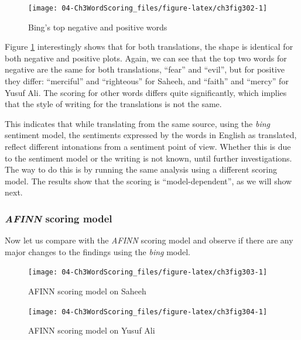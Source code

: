 \documentclass[
]{article}
\begin{document}
\begin{figure}

{\centering \texttt{[image: 04-Ch3WordScoring\_files/figure-latex/ch3fig302-1]} 

}

\caption{Bing's top negative and positive words}\label{fig:ch3fig302}
\end{figure}

Figure \ref{fig:ch3fig302} interestingly shows that for both translations, the shape is identical for both negative and positive plots. Again, we can see that the top two words for negative are the same for both translations, ``fear'' and ``evil'', but for positive they differ: ``merciful'' and ``righteous'' for Saheeh, and ``faith'' and ``mercy'' for Yusuf Ali. The scoring for other words differs quite significantly, which implies that the style of writing for the translations is not the same.

This indicates that while translating from the same source, using the \emph{bing} sentiment model, the sentiments expressed by the words in English as translated, reflect different intonations from a sentiment point of view. Whether this is due to the sentiment model or the writing is not known, until further investigations. The way to do this is by running the same analysis using a different scoring model. The results show that the scoring is ``model-dependent'', as we will show next.

\hypertarget{afinn-scoring-model}{%
\subsubsection{\texorpdfstring{\emph{AFINN} scoring model}{AFINN scoring model}}\label{afinn-scoring-model}}

Now let us compare with the \emph{AFINN} scoring model and observe if there are any major changes to the findings using the \emph{bing} model.

\begin{figure}

{\centering \texttt{[image: 04-Ch3WordScoring\_files/figure-latex/ch3fig303-1]} 

}

\caption{AFINN scoring model on Saheeh}\label{fig:ch3fig303}
\end{figure}

\begin{figure}

{\centering \texttt{[image: 04-Ch3WordScoring\_files/figure-latex/ch3fig304-1]} 

}

\caption{AFINN scoring model on Yusuf Ali}\label{fig:ch3fig304}
\end{figure}
\end{document}
